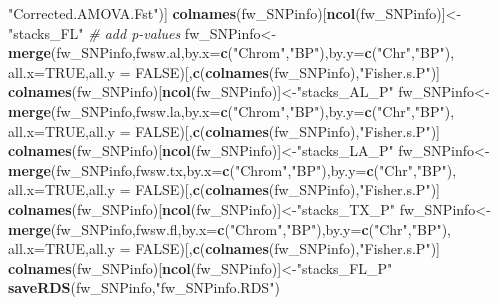 \documentclass[11pt,]{article}
\newenvironment{Shaded}{\begin{snugshade}}{\end{snugshade}}
\newcommand{\KeywordTok}[1]{\textcolor[rgb]{0.13,0.29,0.53}{\textbf{#1}}}
\newcommand{\DataTypeTok}[1]{\textcolor[rgb]{0.13,0.29,0.53}{#1}}
\newcommand{\StringTok}[1]{\textcolor[rgb]{0.31,0.60,0.02}{#1}}
\newcommand{\CommentTok}[1]{\textcolor[rgb]{0.56,0.35,0.01}{\textit{#1}}}
\newcommand{\OtherTok}[1]{\textcolor[rgb]{0.56,0.35,0.01}{#1}}
\newcommand{\NormalTok}[1]{#1}
\begin{document}
\begin{Shaded}
\begin{Highlighting}[]
                                               \StringTok{"Corrected.AMOVA.Fst"}\NormalTok{)] }
\KeywordTok{colnames}\NormalTok{(fw_SNPinfo)[}\KeywordTok{ncol}\NormalTok{(fw_SNPinfo)]<-}\StringTok{"stacks_FL"}
\CommentTok{# add p-values}
\NormalTok{fw_SNPinfo<-}\KeywordTok{merge}\NormalTok{(fw_SNPinfo,fwsw.al,}\DataTypeTok{by.x=}\KeywordTok{c}\NormalTok{(}\StringTok{"Chrom"}\NormalTok{,}\StringTok{"BP"}\NormalTok{),}\DataTypeTok{by.y=}\KeywordTok{c}\NormalTok{(}\StringTok{"Chr"}\NormalTok{,}\StringTok{"BP"}\NormalTok{),}
                  \DataTypeTok{all.x=}\OtherTok{TRUE}\NormalTok{,}\DataTypeTok{all.y =} \OtherTok{FALSE}\NormalTok{)[,}\KeywordTok{c}\NormalTok{(}\KeywordTok{colnames}\NormalTok{(fw_SNPinfo),}\StringTok{"Fisher.s.P"}\NormalTok{)] }
\KeywordTok{colnames}\NormalTok{(fw_SNPinfo)[}\KeywordTok{ncol}\NormalTok{(fw_SNPinfo)]<-}\StringTok{"stacks_AL_P"}
\NormalTok{fw_SNPinfo<-}\KeywordTok{merge}\NormalTok{(fw_SNPinfo,fwsw.la,}\DataTypeTok{by.x=}\KeywordTok{c}\NormalTok{(}\StringTok{"Chrom"}\NormalTok{,}\StringTok{"BP"}\NormalTok{),}\DataTypeTok{by.y=}\KeywordTok{c}\NormalTok{(}\StringTok{"Chr"}\NormalTok{,}\StringTok{"BP"}\NormalTok{),}
                  \DataTypeTok{all.x=}\OtherTok{TRUE}\NormalTok{,}\DataTypeTok{all.y =} \OtherTok{FALSE}\NormalTok{)[,}\KeywordTok{c}\NormalTok{(}\KeywordTok{colnames}\NormalTok{(fw_SNPinfo),}\StringTok{"Fisher.s.P"}\NormalTok{)] }
\KeywordTok{colnames}\NormalTok{(fw_SNPinfo)[}\KeywordTok{ncol}\NormalTok{(fw_SNPinfo)]<-}\StringTok{"stacks_LA_P"}
\NormalTok{fw_SNPinfo<-}\KeywordTok{merge}\NormalTok{(fw_SNPinfo,fwsw.tx,}\DataTypeTok{by.x=}\KeywordTok{c}\NormalTok{(}\StringTok{"Chrom"}\NormalTok{,}\StringTok{"BP"}\NormalTok{),}\DataTypeTok{by.y=}\KeywordTok{c}\NormalTok{(}\StringTok{"Chr"}\NormalTok{,}\StringTok{"BP"}\NormalTok{),}
                  \DataTypeTok{all.x=}\OtherTok{TRUE}\NormalTok{,}\DataTypeTok{all.y =} \OtherTok{FALSE}\NormalTok{)[,}\KeywordTok{c}\NormalTok{(}\KeywordTok{colnames}\NormalTok{(fw_SNPinfo),}\StringTok{"Fisher.s.P"}\NormalTok{)] }
\KeywordTok{colnames}\NormalTok{(fw_SNPinfo)[}\KeywordTok{ncol}\NormalTok{(fw_SNPinfo)]<-}\StringTok{"stacks_TX_P"}
\NormalTok{fw_SNPinfo<-}\KeywordTok{merge}\NormalTok{(fw_SNPinfo,fwsw.fl,}\DataTypeTok{by.x=}\KeywordTok{c}\NormalTok{(}\StringTok{"Chrom"}\NormalTok{,}\StringTok{"BP"}\NormalTok{),}\DataTypeTok{by.y=}\KeywordTok{c}\NormalTok{(}\StringTok{"Chr"}\NormalTok{,}\StringTok{"BP"}\NormalTok{),}
                  \DataTypeTok{all.x=}\OtherTok{TRUE}\NormalTok{,}\DataTypeTok{all.y =} \OtherTok{FALSE}\NormalTok{)[,}\KeywordTok{c}\NormalTok{(}\KeywordTok{colnames}\NormalTok{(fw_SNPinfo),}\StringTok{"Fisher.s.P"}\NormalTok{)] }
\KeywordTok{colnames}\NormalTok{(fw_SNPinfo)[}\KeywordTok{ncol}\NormalTok{(fw_SNPinfo)]<-}\StringTok{"stacks_FL_P"}
\KeywordTok{saveRDS}\NormalTok{(fw_SNPinfo,}\StringTok{"fw_SNPinfo.RDS"}\NormalTok{)}
\end{Highlighting}
\end{Shaded}
\end{document}
